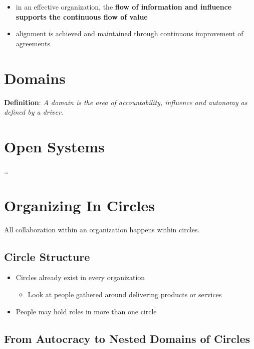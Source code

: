 \begin{itemize}
\item in an effective organization, the \textbf{flow of information and influence supports the continuous flow of value}

\item alignment is achieved and maintained through continuous improvement of agreements

\end{itemize}

\section{Domains}
\label{domains}

\textbf{Definition}: \emph{A domain is the area of accountability, influence and autonomy as defined by a driver.}

\section{Open Systems}
\label{opensystems}

{\ldots}

\section{Organizing In Circles}
\label{organizingincircles}

All collaboration within an organization happens within circles.

\subsection{Circle Structure}
\label{circlestructure}

\begin{itemize}
\item Circles already exist in every organization

\begin{itemize}
\item Look at people gathered around delivering products or services

\end{itemize}

\item People may hold roles in more than one circle

\end{itemize}

\subsection{From Autocracy to Nested Domains of Circles}
\label{fromautocracytonesteddomainsofcircles}

